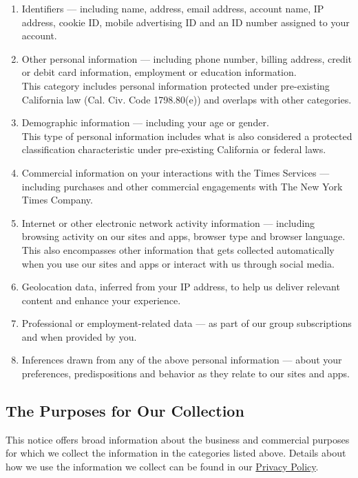 \begin{enumerate}
\def\labelenumi{\arabic{enumi}.}
\item
  Identifiers --- including name, address, email address, account name,
  IP address, cookie ID, mobile advertising ID and an ID number assigned
  to your account.
\item
  Other personal information --- including phone number, billing
  address, credit or debit card information, employment or education
  information.\\
  This category includes personal information protected under
  pre-existing California law (Cal. Civ. Code 1798.80(e)) and overlaps
  with other categories.
\item
  Demographic information --- including your age or gender.\\
  This type of personal information includes what is also considered a
  protected classification characteristic under pre-existing California
  or federal laws.
\item
  Commercial information on your interactions with the Times Services
  --- including purchases and other commercial engagements with The New
  York Times Company.
\item
  Internet or other electronic network activity information ---
  including browsing activity on our sites and apps, browser type and
  browser language. This also encompasses other information that gets
  collected automatically when you use our sites and apps or interact
  with us through social media.
\item
  Geolocation data, inferred from your IP address, to help us deliver
  relevant content and enhance your experience.
\item
  Professional or employment-related data --- as part of our group
  subscriptions and when provided by you.
\item
  Inferences drawn from any of the above personal information --- about
  your preferences, predispositions and behavior as they relate to our
  sites and apps.
\end{enumerate}

\hypertarget{the-purposes-for-our-collection}{%
\subsection{The Purposes for Our
Collection}\label{the-purposes-for-our-collection}}

This notice offers broad information about the business and commercial
purposes for which we collect the information in the categories listed
above. Details about how we use the information we collect can be found
in our
\href{http://www.nytimes3xbfgragh.onion/privacy/privacy-policy\#what--do-we-do-with-the-information-we-gather}{Privacy
Policy}.

